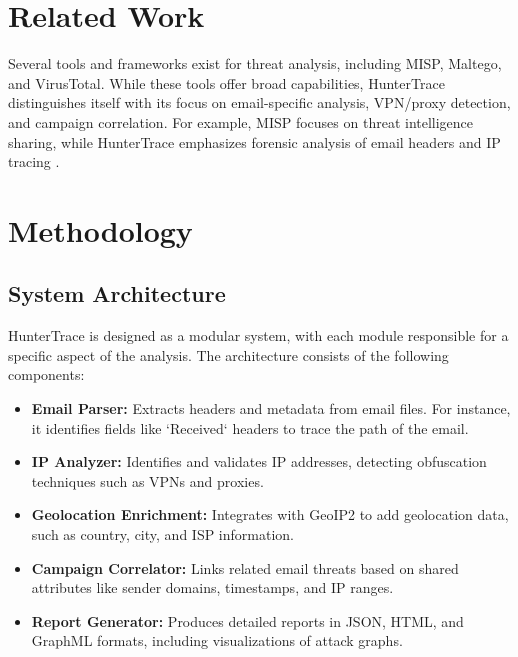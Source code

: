 \documentclass[conference]{IEEEtran}
\begin{document}
\section{Related Work}
Several tools and frameworks exist for threat analysis, including MISP, Maltego, and VirusTotal. While these tools offer broad capabilities, HunterTrace distinguishes itself with its focus on email-specific analysis, VPN/proxy detection, and campaign correlation. For example, MISP focuses on threat intelligence sharing, while HunterTrace emphasizes forensic analysis of email headers and IP tracing \cite{misp, maltego, virustotal}.

\section{Methodology}
\subsection{System Architecture}
HunterTrace is designed as a modular system, with each module responsible for a specific aspect of the analysis. The architecture consists of the following components:
\begin{itemize}
    \item \textbf{Email Parser:} Extracts headers and metadata from email files. For instance, it identifies fields like `Received` headers to trace the path of the email.
    \item \textbf{IP Analyzer:} Identifies and validates IP addresses, detecting obfuscation techniques such as VPNs and proxies.
    \item \textbf{Geolocation Enrichment:} Integrates with GeoIP2 to add geolocation data, such as country, city, and ISP information.
    \item \textbf{Campaign Correlator:} Links related email threats based on shared attributes like sender domains, timestamps, and IP ranges.
    \item \textbf{Report Generator:} Produces detailed reports in JSON, HTML, and GraphML formats, including visualizations of attack graphs.
\end{itemize}
\end{document}
